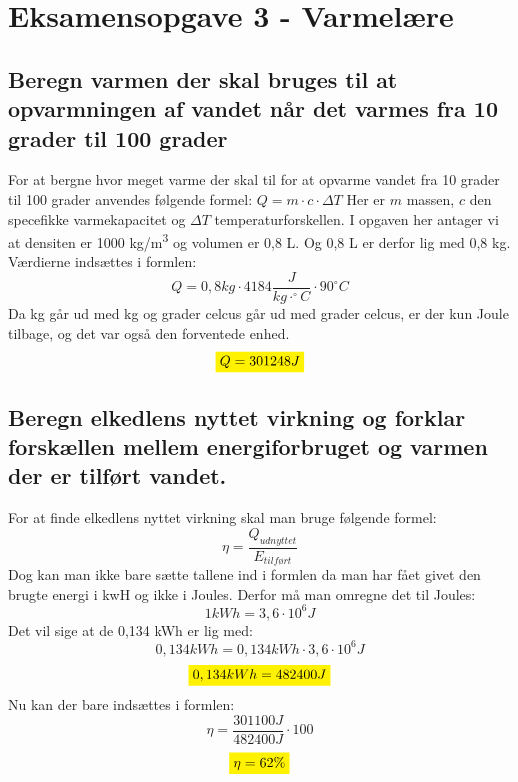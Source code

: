 \section{Eksamensopgave 3 - Varmelære}
\subsection{Beregn varmen der skal bruges til at opvarmningen af vandet når det varmes fra 10 grader til 100 grader}
For at bergne hvor meget varme der skal til for at opvarme vandet fra 10 grader til 100 grader anvendes følgende formel:
\begin{math}Q=m \cdot c \cdot \Delta T\end{math} Her er \begin{math}m\end{math} massen, \begin{math}c\end{math} den specefikke varmekapacitet og \begin{math}\Delta T\end{math} temperaturforskellen. I opgaven her antager vi at densiten er 1000 kg/m\textsuperscript{3} og volumen er 0,8 L. Og 0,8 L er derfor lig med 0,8 kg.
Værdierne indsættes i formlen:
\begin{equation*}
    Q =  0,8 kg \cdot 4184 \frac{J}{kg \cdot  ^{\circ}C} \cdot 90^{\circ}C 
\end{equation*}
Da kg går ud med kg og grader celcus går ud med grader celcus, er der kun Joule tilbage, og det var også den forventede enhed.
\begin{equation*}
    \mathcolorbox{yellow}{Q= 301248 J}
\end{equation*}

\subsection{Beregn elkedlens nyttet virkning og forklar forskællen mellem energiforbruget og varmen der er tilført vandet.}
For at finde elkedlens nyttet virkning skal man bruge følgende formel: 
\begin{equation*}
    \eta=\frac{Q_{udnyttet}}{E_{tilført}}
\end{equation*}
Dog kan man ikke bare sætte tallene ind i formlen da man har fået givet den brugte energi i kwH og ikke i Joules. 
Derfor må man omregne det til Joules:
\begin{equation*}
    1 kWh = 3,6 \cdot 10^6 J
\end{equation*}
Det vil sige at de 0,134 kWh er lig med:
\begin{equation*}
    0,134 kWh = 0,134 kWh \cdot 3,6 \cdot 10^6 J
\end{equation*}
\begin{equation*}
    \mathcolorbox{yellow}{0,134 kWh = 482400 J}
\end{equation*}
Nu kan der bare indsættes i formlen:
\begin{equation*}
    \eta=\frac{301100 J}{482400 J}\cdot 100
\end{equation*}
\begin{equation*}
    \mathcolorbox{yellow}{\eta=62\%}
\end{equation*}


